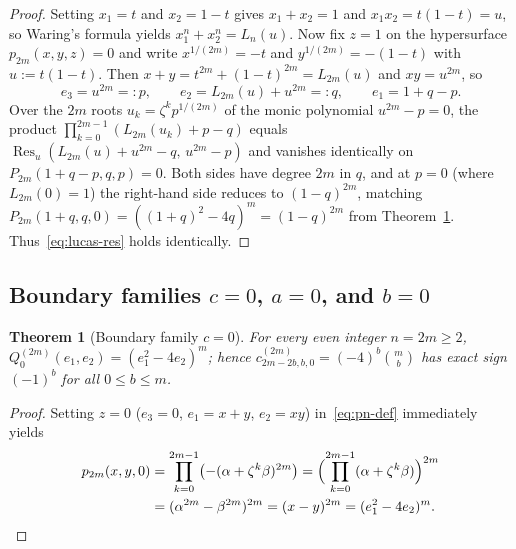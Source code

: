 \documentclass[10pt]{article}
\numberwithin{equation}{section}
\theoremstyle{plain}
\newtheorem{theorem}{Theorem}[section]
\theoremstyle{definition}
\newcommand{\1}{\mathbf{1}}
\DeclareMathOperator{\Res}{Res}
\begin{document}
\begin{proof}
Setting $x_1 = t$ and $x_2 = 1 - t$ gives $x_1 + x_2 = 1$ and $x_1 x_2 = t(1 - t) = u$, so Waring's formula yields $x_1^n + x_2^n = L_n(u)$. Now fix $z = 1$ on the hypersurface $p_{2m}(x, y, z) = 0$ and write $x^{1/(2m)} = -t$ and $y^{1/(2m)} = -(1 - t)$ with $u := t(1 - t)$. Then $x + y = t^{2m} + (1 - t)^{2m} = L_{2m}(u)$ and $xy = u^{2m}$, so
\[
e_3 = u^{2m} =: p, \qquad e_2 = L_{2m}(u) + u^{2m} =: q, \qquad e_1 = 1 + q - p.
\]
Over the $2m$ roots $u_k = \zeta^k p^{1/(2m)}$ of the monic polynomial $u^{2m} - p = 0$, the product $\prod_{k=0}^{2m-1}(L_{2m}(u_k) + p - q)$ equals $\Res_u(L_{2m}(u) + u^{2m} - q,\, u^{2m} - p)$ and vanishes identically on $P_{2m}(1 + q - p, q, p) = 0$. Both sides have degree $2m$ in $q$, and at $p = 0$ (where $L_{2m}(0) = 1$) the right-hand side reduces to $(1 - q)^{2m}$, matching $P_{2m}(1 + q, q, 0) = ((1+q)^2 - 4q)^m = (1 - q)^{2m}$ from Theorem~\ref{thm:bdy-c0}. Thus~\eqref{eq:lucas-res} holds identically.
\end{proof}

\subsection{Boundary families \texorpdfstring{$c = 0$, $a = 0$, and $b = 0$}{c = 0, a = 0, and b = 0}}
\label{sec:bdy-cab}

\begin{theorem}[Boundary family $c = 0$]\label{thm:bdy-c0}
For every even integer $n = 2m \ge 2$, $Q_0^{(2m)}(e_1, e_2) = (e_1^2 - 4e_2)^m$; hence $c_{2m-2b, b, 0}^{(2m)} = (-4)^b\binom{m}{b}$ has exact sign $(-1)^b$ for all $0 \le b \le m$.
\end{theorem}

\begin{proof}
Setting $z = 0$ ($e_3 = 0$, $e_1 = x + y$, $e_2 = xy$) in~\eqref{eq:pn-def} immediately yields
\begin{align*}
p_{2m}(x, y, 0) &= \prod_{k=0}^{2m-1}\bigl(-(\alpha + \zeta^k\beta)^{2m}\bigr)
= \Bigl(\prod_{k=0}^{2m-1}(\alpha + \zeta^k\beta)\Bigr)^{2m} \\
&= (\alpha^{2m} - \beta^{2m})^{2m} = (x - y)^{2m} = (e_1^2 - 4e_2)^m. \qedhere
\end{align*}
\end{proof}
\end{document}
